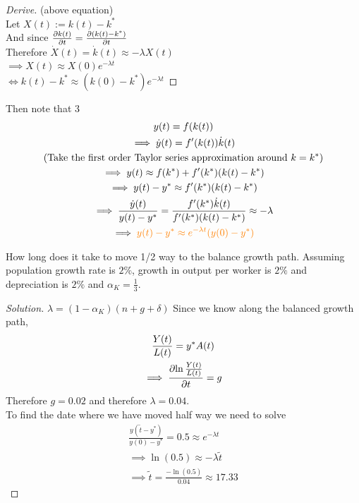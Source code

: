 \documentclass[]{article}
\begin{document}
	    \begin{remark}
		    \begin{proof}[Derive] (above equation)\\
		        Let $X(t) := k(t) - k^*$ \\
		        And since $\frac{\partial{k(t)}}{\partial{t}} = \frac{\partial{(k(t) - k^*)}}{\partial{t}}$ \\
		        Therefore $\dot{X}(t) = \dot{k}(t) \approx -\lambda X(t)$ \\
		        $\implies X(t) \approx X(0) e^{-\lambda t}$ \\
		        $\iff k(t) - k^* \approx (k(0) - k^*) e^{-\lambda t}$
		    \end{proof}
	    \end{remark}
	    Then note that 3
	    \begin{gather*}
	        y(t) = f(k(t)) \\
	        \implies \dot{y}(t) = f'(k(t))\dot{k}(t) \\
	        \text{{(Take the first order Taylor series approximation around $k=k^*$)}} \\
	        \implies y(t) \approx f(k^*) + f'(k^*) (k(t)-k^*) \\
	        \implies y(t) - y^* \approx f'(k^*)(k(t) - k^*) \\
	        \implies \frac{\dot{y}(t)}{y(t) - y^*} = \frac{f'(k^*)\dot{k}(t)}{f'(k^*)(k(t) - k^*)} \approx - \lambda \\
	       \implies \textcolor{orange}{
	       		y(t) - y^* \approx e^{- \lambda t} (y(0) - y^*)
	       }
	    \end{gather*}
	    
	    \begin{example}
	        How long does it take to move 1/2 way to the balance growth path. Assuming population growth rate is $2\%$, growth in output per worker is $2\%$ and depreciation is $2\%$ and  $\alpha_K = \frac{1}{3}$.
	        \begin{proof}[Solution]
	            $\lambda = (1 - \alpha_K)(n + g + \delta)$ 
	            Since we know along the balanced growth path, \begin{gather*}
	                \frac{Y(t)}{L(t)} = y^* A(t) \\
	                \implies \frac{\partial{\ln{\frac{Y(t)}{L(t)}}}}{\partial{t}} = g
	            \end{gather*}
	            Therefore $g = 0.02$ and therefore $\lambda = 0.04$. \\
	            To find the date where we have moved half way we need to solve 
	            \begin{gather*}
	                \frac{y(\tilde{t} - y^*)}{y(0) - y^*} = 0.5 \approx e^{-\lambda t}\\
	                \implies \ln(0.5) \approx -\lambda \tilde{t} \\
	                \implies \tilde{t} = \frac{-\ln(0.5)}{0.04} \approx 17.33
	            \end{gather*}
	        \end{proof}
	    \end{example}
	    
\end{document}
